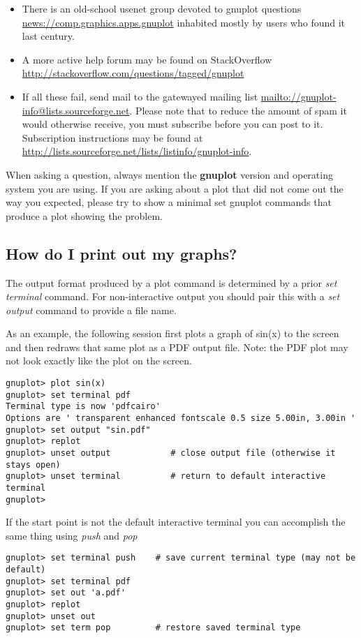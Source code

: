 \documentclass[letter,11pt]{article}
\def\http#1{{\small\href{http://#1}{\url{http://#1}}}}
\def\mailto#1{{\small\href{mailto://#1}{\url{mailto://#1}}}}
\def\news#1{\href{news://#1}{\url{news://#1}}}
\newcommand{\news}[1]%
            {\def~{\~{}}\htmladdnormallink{\latex{\url{#1}}\html{\textit{#1}}}%
                {news:#1}%
            }
\newcommand{\mailto}[1]%
            {\htmladdnormallink{\latex{\url{<#1>}}\html{\textit{#1}}}%
                {mailto:#1}%
            }
\newcommand{\http}[1]%
            {\htmladdnormallink{\latex{\url{http://#1}}%
                    \html{\textit{http://#1}}}%
                {http://#1}%
            }
\newcommand{\gnuplot}{\textbf{gnuplot }}
\begin{document}
{\begin{itemize}
\item
There is an old-school usenet group devoted to gnuplot questions
\news{comp.graphics.apps.gnuplot}
inhabited mostly by users who found it last century.

\item
A more active help forum may be found on StackOverflow
\http{stackoverflow.com/questions/tagged/gnuplot}

\item
If all these fail, send mail to the gatewayed mailing list
\mailto{gnuplot-info@lists.sourceforge.net}.
Please note that to reduce the amount of spam it would otherwise receive,
you must subscribe before you can post to it. Subscription instructions
may be found at
\http{lists.sourceforge.net/lists/listinfo/gnuplot-info}.

\end{itemize}
When asking a question, always mention the \gnuplot version and
operating system you are using.  If you are asking about a plot that
did not come out the way you expected, please try to show a minimal
set gnuplot commands that produce a plot showing the problem.


\subsection{How do I print out my graphs?}

The output format produced by a plot command is determined by a
prior {\em set terminal} command.  For non-interactive output
you should pair this with a {\em set output} command to provide
a file name.

As an example, the following session first plots a graph of sin(x) to the
screen and then redraws that same plot as a PDF output file.
Note: the PDF plot may not look exactly like the plot on the screen.

\small
\begin{verbatim}
gnuplot> plot sin(x)
gnuplot> set terminal pdf
Terminal type is now 'pdfcairo'
Options are ' transparent enhanced fontscale 0.5 size 5.00in, 3.00in '
gnuplot> set output "sin.pdf"
gnuplot> replot
gnuplot> unset output            # close output file (otherwise it stays open)
gnuplot> unset terminal          # return to default interactive terminal
gnuplot>
\end{verbatim}
\normalsize

If the start point is not the default interactive terminal you
can accomplish the same thing using {\em push} and {\em pop}
\small
\begin{verbatim}
gnuplot> set terminal push    # save current terminal type (may not be default)
gnuplot> set terminal pdf
gnuplot> set out 'a.pdf'
gnuplot> replot
gnuplot> unset out
gnuplot> set term pop         # restore saved terminal type
\end{verbatim}
\normalsize

}
\end{document}
